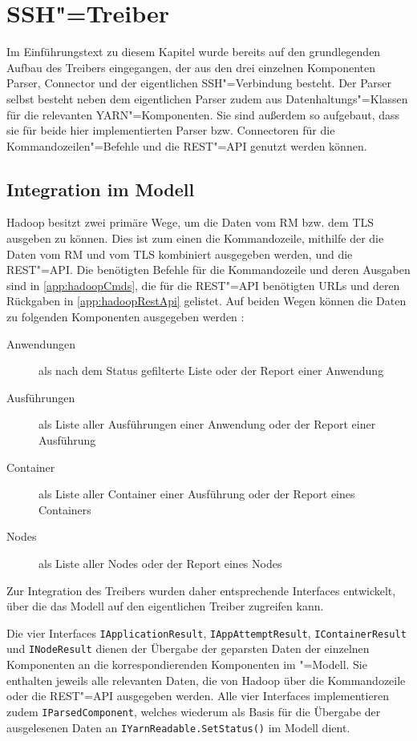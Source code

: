 \section{SSH"=Treiber}\label{sec:sshDriver}

Im Einführungstext zu diesem Kapitel wurde bereits auf den grundlegenden Aufbau des Treibers eingegangen, der aus den drei einzelnen Komponenten Parser, Connector und der eigentlichen SSH"=Verbindung besteht.
Der Parser selbst besteht neben dem eigentlichen Parser zudem aus Datenhaltungs"=Klassen für die relevanten YARN"=Komponenten.
Sie sind außerdem so aufgebaut, dass sie für beide hier implementierten Parser bzw. Connectoren für die Kommandozeilen"=Befehle und die REST"=API genutzt werden können.

\subsection{Integration im Modell}\label{sec:modelIntegration}

Hadoop besitzt zwei primäre Wege, um die Daten vom \ac{RM} bzw. dem \ac{TLS} ausgeben zu können.
Dies ist zum einen die Kommandozeile, mithilfe der die Daten vom \ac{RM} und vom \ac{TLS} kombiniert ausgegeben werden, und die REST"=API.
Die benötigten Befehle für die Kommandozeile und deren Ausgaben sind in \autoref{app:hadoopCmds}, die für die REST"=API benötigten URLs und deren Rückgaben in \autoref{app:hadoopRestApi} gelistet.
Auf beiden Wegen können \uA die Daten zu folgenden Komponenten ausgegeben werden \cite{HadoopYarnTlServer271,HadoopYarnCmds271,HadoopRmApi271,HadoopNmApi271}:

\begin{description}
    \item[Anwendungen] als nach dem Status gefilterte Liste oder der Report einer Anwendung
    \item[Ausführungen] als Liste aller Ausführungen einer Anwendung oder der Report einer Ausführung
    \item[Container] als Liste aller Container einer Ausführung oder der Report eines Containers
    \item[Nodes] als Liste aller Nodes oder der Report eines Nodes
\end{description}

Zur Integration des Treibers wurden daher entsprechende Interfaces entwickelt, über die das Modell auf den eigentlichen Treiber zugreifen kann.

Die vier Interfaces \texttt{IApplicationResult}, \texttt{IAppAttemptResult}, \texttt{IContainerResult} und \texttt{INodeResult} dienen der Übergabe der geparsten Daten der einzelnen Komponenten an die korrespondierenden Komponenten im \sS"=Modell.
Sie enthalten jeweils alle relevanten Daten, die von Hadoop über die Kommandozeile oder die REST"=API ausgegeben werden.
Alle vier Interfaces implementieren zudem \texttt{IParsedComponent}, welches wiederum als Basis für die Übergabe der ausgelesenen Daten an \texttt{IYarnReadable.SetStatus()} im Modell dient.

